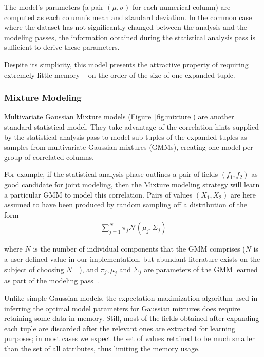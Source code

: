 The model's parameters (a pair $(\mu, \sigma)$ for each numerical column) are computed as each column's mean and standard deviation. In the common case where the dataset has not significantly changed between the analysis and the modeling passes, the information obtained during the statistical analysis pass is sufficient to derive these parameters.

Despite its simplicity, this model presents the attractive property of requiring extremely little memory -- on the order of the size of one expanded tuple.


\subsubsection{Mixture Modeling}
\label{sec:mixture_model}
Multivariate Gaussian Mixture models (Figure~\ref{fig:mixture}) are another standard statistical model.  They take advantage of the correlation hints supplied by the statistical analysis pass to model sub-tuples of the expanded tuples as samples from multivariate Gaussian mixtures (GMMs), creating one model per group of correlated columns.

For example, if the statistical analysis phase outlines a pair of fields $(f_1, f_2)$ as good candidate for joint modeling, then the Mixture modeling strategy will learn a particular GMM to model this correlation. Pairs of values $(X_1, X_2)$ are here assumed to have been produced by random sampling off a distribution of the form
\begin{align*}
\sum_{j=1}^{N} \pi_j \mathcal N(\mu_j, \Sigma_j)
\end{align*}

where $N$ is the number of individual components that the GMM comprises ($N$ is a user-defined value in our implementation, but abundant literature exists on the subject of choosing $N$~\cite{Schwartz1978}~\cite{Akaike1974}), and $\pi_j, \mu_j$ and $\Sigma_j$ are parameters of the GMM learned as part of the modeling pass~\cite{Dempster1977}.

Unlike simple Gaussian models, the expectation maximization algorithm used in inferring the optimal model parameters for Gaussian mixtures does require retaining some data in memory. Still, most of the fields obtained after expanding each tuple are discarded after the relevant ones are extracted for learning purposes; in most cases we expect the set of values retained to be much smaller than the set of all attributes, thus limiting the memory usage.

